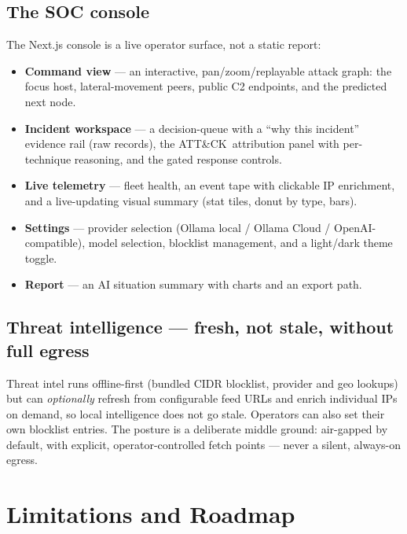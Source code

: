 \documentclass[11pt,a4paper]{article}
\begin{document}
\subsection{The SOC console}

The Next.js console is a live operator surface, not a static report:

\begin{itemize}[leftmargin=1.4em,itemsep=2pt]
  \item \textbf{Command view} — an interactive, pan/zoom/replayable attack graph: the focus
        host, lateral-movement peers, public C2 endpoints, and the predicted next node.
  \item \textbf{Incident workspace} — a decision-queue with a ``why this incident'' evidence
        rail (raw records), the ATT\&CK\ attribution panel with per-technique reasoning, and the
        gated response controls.
  \item \textbf{Live telemetry} — fleet health, an event tape with clickable IP enrichment, and
        a live-updating visual summary (stat tiles, donut by type, bars).
  \item \textbf{Settings} — provider selection (Ollama local / Ollama Cloud / OpenAI-compatible),
        model selection, blocklist management, and a light/dark theme toggle.
  \item \textbf{Report} — an AI situation summary with charts and an export path.
\end{itemize}

\subsection{Threat intelligence — fresh, not stale, without full egress}

Threat intel runs offline-first (bundled CIDR blocklist, provider and geo lookups) but can
\emph{optionally} refresh from configurable feed URLs and enrich individual IPs on demand, so
local intelligence does not go stale. Operators can also set their own blocklist entries. The
posture is a deliberate middle ground: air-gapped by default, with explicit, operator-controlled
fetch points — never a silent, always-on egress.

\section{Limitations and Roadmap}
\end{document}
